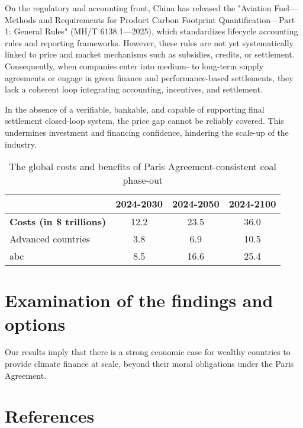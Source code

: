 \documentclass[a4paper,11pt]{article}
\begin{document}
On the regulatory and accounting front, China has released the "Aviation Fuel---Methods and Requirements for Product Carbon Footprint Quantification---Part 1: General Rules" (MH/T 6138.1---2025), which standardizes lifecycle accounting rules and reporting frameworks. However, these rules are not yet systematically linked to price and market mechanisms such as subsidies, credits, or settlement. Consequently, when companies enter into medium- to long-term supply agreements or engage in green finance and performance-based settlements, they lack a coherent loop integrating accounting, incentives, and settlement.

In the absence of a verifiable, bankable, and capable of supporting final settlement closed-loop system, the price gap cannot be reliably covered. This undermines investment and financing confidence, hindering the scale-up of the industry.









\begin{table}[h]
\centering
\caption{The global costs and benefits of Paris Agreement-consistent coal phase-out}
\begin{tabular}{lccc}
\toprule
& 2024-2030 & 2024-2050 & 2024-2100 \\
\midrule
\textbf{Costs (in \$ trillions)} & 12.2 & 23.5 & 36.0 \\
\quad Advanced countries & 3.8 & 6.9 & 10.5 \\
\quad abc & 8.5 & 16.6 & 25.4 \\
\bottomrule
\end{tabular}
\end{table}

\section{Examination of the findings and options}
Our results imply that there is a strong economic case for wealthy countries to provide climate finance at scale, beyond their moral obligations under the Paris Agreement.


\section{References}
\end{document}
